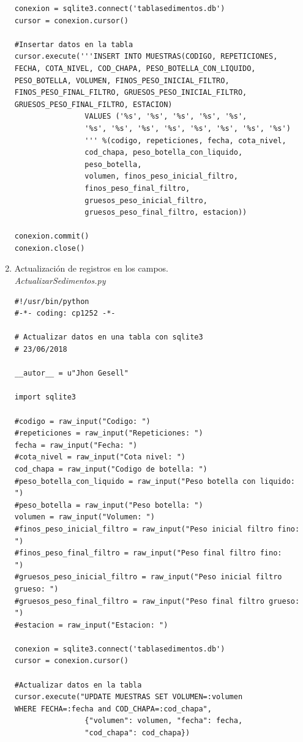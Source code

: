 \documentclass[a4paper,openright,12pt]{report}
\begin{document}
\begin{enumerate}
\begin{lstlisting}
conexion = sqlite3.connect('tablasedimentos.db')
cursor = conexion.cursor()

#Insertar datos en la tabla
cursor.execute('''INSERT INTO MUESTRAS(CODIGO, REPETICIONES,
FECHA, COTA_NIVEL, COD_CHAPA, PESO_BOTELLA_CON_LIQUIDO,
PESO_BOTELLA, VOLUMEN, FINOS_PESO_INICIAL_FILTRO,
FINOS_PESO_FINAL_FILTRO, GRUESOS_PESO_INICIAL_FILTRO, 
GRUESOS_PESO_FINAL_FILTRO, ESTACION)
                VALUES ('%s', '%s', '%s', '%s', '%s',
                '%s', '%s', '%s', '%s', '%s', '%s', '%s', '%s')
                ''' %(codigo, repeticiones, fecha, cota_nivel,
                cod_chapa, peso_botella_con_liquido,
                peso_botella,
                volumen, finos_peso_inicial_filtro,
                finos_peso_final_filtro,
                gruesos_peso_inicial_filtro,
                gruesos_peso_final_filtro, estacion))

conexion.commit()
conexion.close()
\end{lstlisting}

\item Actualizaci\'on de registros en los campos. \\
\textit{ActualizarSedimentos.py}
\begin{lstlisting}
#!/usr/bin/python
#-*- coding: cp1252 -*-

# Actualizar datos en una tabla con sqlite3
# 23/06/2018

__autor__ = u"Jhon Gesell"

import sqlite3

#codigo = raw_input("Codigo: ")
#repeticiones = raw_input("Repeticiones: ")
fecha = raw_input("Fecha: ")
#cota_nivel = raw_input("Cota nivel: ")
cod_chapa = raw_input("Codigo de botella: ")
#peso_botella_con_liquido = raw_input("Peso botella con liquido:
")
#peso_botella = raw_input("Peso botella: ")
volumen = raw_input("Volumen: ")
#finos_peso_inicial_filtro = raw_input("Peso inicial filtro fino:
")
#finos_peso_final_filtro = raw_input("Peso final filtro fino:
")
#gruesos_peso_inicial_filtro = raw_input("Peso inicial filtro
grueso: ")
#gruesos_peso_final_filtro = raw_input("Peso final filtro grueso:
")
#estacion = raw_input("Estacion: ")

conexion = sqlite3.connect('tablasedimentos.db')
cursor = conexion.cursor()

#Actualizar datos en la tabla
cursor.execute("UPDATE MUESTRAS SET VOLUMEN=:volumen
WHERE FECHA=:fecha and COD_CHAPA=:cod_chapa",
                {"volumen": volumen, "fecha": fecha,
                "cod_chapa": cod_chapa})


\end{lstlisting}
\end{enumerate}
\end{document}
